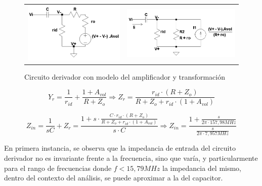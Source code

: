 \begin{figure}[H]
\begin{tabular}{c c}
	\includegraphics[scale=0.55]{../EJ4/Recursos/Derivador/Circuito_derivador_modelo.png} &
	\includegraphics[scale=0.55]{../EJ4/Recursos/Derivador/Circuito_derivador_simplificacion.png}
\end{tabular}
\caption{Circuito derivador con modelo del amplificador y transformaci\'on}
\label{fig:circuito_derivador_impedancia}
\end{figure}

\begin{equation*}
	Y_r = \frac{1}{r_{id}} + \frac{1 + A_{vol}}{R + Z_o} \Rightarrow
	Z_r = \frac{r_{id} \cdot(R + Z_o)}{R + Z_o + r_{id} \cdot(1 + A_{vol})}
\end{equation*}

\begin{equation}
	Z_{in} = \frac{1}{sC} + Z_r
	= \frac{1 + s \cdot \frac{C \cdot r_{id} \cdot (R + Z_o)}{R + Z_o + r_{id} \cdot (1 + A_{vol})}}{s \cdot C}
	\Rightarrow
	Z_{in} = \frac{1 + \frac{s}{2 \pi \cdot 157,98MHz}}{\frac{s}{2 \pi \cdot 7,957MHz}}
	\label{eq:derivador_impedancia_avol_finito}
\end{equation}

En primera instancia, se observa que la impedancia de entrada del circuito derivador no es invariante frente a la frecuencia,
sino que var\'ia, y particularmente para el rango de frecuencias donde $f < 15,79MHz$ la impedancia del mismo, dentro del contexto del an\'alisis, se puede
aproximar a la del capacitor.

